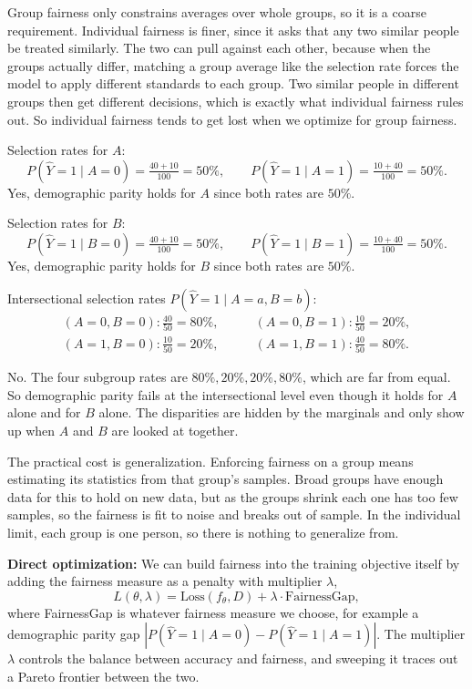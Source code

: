 \documentclass{cisXXX} %
\begin{document}
\HWproblem
\HWsubproblem
Group fairness only constrains averages over whole groups, so it is a coarse requirement. Individual fairness is finer, since it asks that any two similar people be treated similarly. The two can pull against each other, because when the groups actually differ, matching a group average like the selection rate forces the model to apply different standards to each group. Two similar people in different groups then get different decisions, which is exactly what individual fairness rules out. So individual fairness tends to get lost when we optimize for group fairness.

\HWsubproblem
Selection rates for $A$:
$$P(\hat{Y}=1 \mid A=0) = \tfrac{40+10}{100} = 50\%, \qquad P(\hat{Y}=1 \mid A=1) = \tfrac{10+40}{100} = 50\%.$$
Yes, demographic parity holds for $A$ since both rates are $50\%$.

\HWsubproblem
Selection rates for $B$:
$$P(\hat{Y}=1 \mid B=0) = \tfrac{40+10}{100} = 50\%, \qquad P(\hat{Y}=1 \mid B=1) = \tfrac{10+40}{100} = 50\%.$$
Yes, demographic parity holds for $B$ since both rates are $50\%$.

\HWsubproblem
Intersectional selection rates $P(\hat{Y}=1 \mid A=a, B=b)$:
\begin{align*}
(A{=}0, B{=}0): \tfrac{40}{50} = 80\%, \qquad & (A{=}0, B{=}1): \tfrac{10}{50} = 20\%, \\
(A{=}1, B{=}0): \tfrac{10}{50} = 20\%, \qquad & (A{=}1, B{=}1): \tfrac{40}{50} = 80\%.
\end{align*}

\HWsubproblem
No. The four subgroup rates are $80\%, 20\%, 20\%, 80\%$, which are far from equal. So demographic parity fails at the intersectional level even though it holds for $A$ alone and for $B$ alone. The disparities are hidden by the marginals and only show up when $A$ and $B$ are looked at together.

\HWsubproblem
The practical cost is generalization. Enforcing fairness on a group means estimating its statistics from that group's samples. Broad groups have enough data for this to hold on new data, but as the groups shrink each one has too few samples, so the fairness is fit to noise and breaks out of sample. In the individual limit, each group is one person, so there is nothing to generalize from.

\HWproblem
\HWsubproblem
\textbf{Direct optimization:} We can build fairness into the training objective itself by adding the fairness measure as a penalty with multiplier $\lambda$,
$$L(\theta, \lambda) = \mathrm{Loss}(f_\theta, D) + \lambda \cdot \mathrm{FairnessGap},$$
where FairnessGap is whatever fairness measure we choose, for example a demographic parity gap $|P(\hat{Y}=1 \mid A=0) - P(\hat{Y}=1 \mid A=1)|$. The multiplier $\lambda$ controls the balance between accuracy and fairness, and sweeping it traces out a Pareto frontier between the two.
\end{document}
